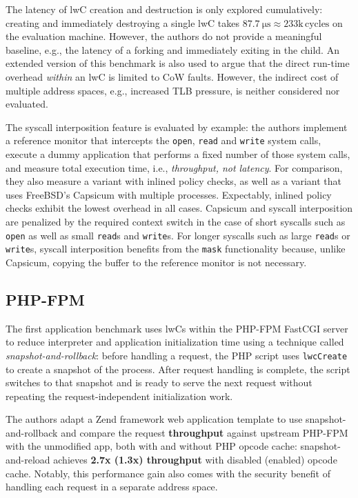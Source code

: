 \documentclass[10pt,twocolumn,a4paper]{article}
\begin{document}
The latency of lwC creation and destruction is only explored cumulatively: creating and immediately destroying a single lwC takes $\SI{87.7}{\micro\second} \approx 233\text{k}\,\text{cycles}$ on the evaluation machine. %
However, the authors do not provide a meaningful baseline, e.g., the latency of a forking and immediately exiting in the child.
An extended version of this benchmark is also used to argue that the direct run-time overhead \textit{within} an lwC is limited to CoW faults.
However, the indirect cost of multiple address spaces, e.g., increased TLB pressure, is neither considered nor evaluated.
\cite{lwcpaper}

The syscall interposition feature is evaluated by example:
the authors implement a reference monitor that intercepts the \lstinline{open}, \lstinline{read} and \lstinline{write} system calls, execute a dummy application that performs a fixed number of those system calls, and measure total execution time, i.e., \textit{throughput, not latency}.
For comparison, they also measure a variant with inlined policy checks, as well as a variant that uses FreeBSD's Capsicum with multiple processes.
Expectably, inlined policy checks exhibit the lowest overhead in all cases.
Capsicum and syscall interposition are penalized by the required context switch in the case of short syscalls such as \lstinline{open} as well as small \lstinline{read}s and \lstinline{write}s.
For longer syscalls such as large \lstinline{read}s or \lstinline{write}s, syscall interposition benefits from the \lstinline{mask} functionality because, unlike Capsicum, copying the buffer to the reference monitor is not necessary.
\cite{lwcpaper}

\subsection{PHP-FPM}
The first application benchmark uses lwCs within the PHP-FPM FastCGI server to reduce interpreter and application initialization time using a technique called \textit{snapshot-and-rollback}:
before handling a request, the PHP script uses \lstinline{lwcCreate} to create a snapshot of the process.
After request handling is complete, the script switches to that snapshot and is ready to serve the next request without repeating the request-independent initialization work.
\cite{lwcpaper}

The authors adapt a Zend framework web application template to use snapshot-and-rollback and compare the request \textbf{throughput} against upstream PHP-FPM with the unmodified app, both with and without PHP opcode cache:
snapshot-and-reload achieves \textbf{2.7x (1.3x) throughput} with disabled (enabled) opcode cache.
Notably, this performance gain also comes with the security benefit of handling each request in a separate address space.\cite{zend,lwcpaper}
\end{document}
